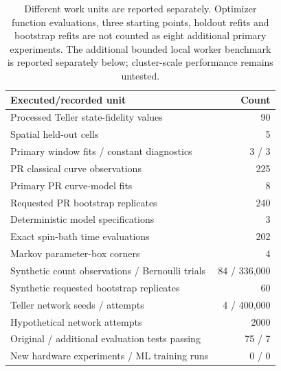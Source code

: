 \documentclass[10pt,a4paper]{article}
\begin{document}
\begin{table}[htbp]
\centering\small
\begin{tabular}{lr}
\toprule Executed/recorded unit & Count\\\midrule
Processed Teller state-fidelity values & 90\\
Spatial held-out cells & 5\\
Primary window fits / constant diagnostics & 3 / 3\\
PR classical curve observations & 225\\
Primary PR curve-model fits & 8\\
Requested PR bootstrap replicates & 240\\
Deterministic model specifications & 3\\
Exact spin-bath time evaluations & 202\\
Markov parameter-box corners & 4\\
Synthetic count observations / Bernoulli trials & 84 / 336,000\\
Synthetic requested bootstrap replicates & 60\\
Teller network seeds / attempts & 4 / 400,000\\
Hypothetical network attempts & 2000\\
Original / additional evaluation tests passing & 75 / 7\\
New hardware experiments / ML training runs & 0 / 0\\\bottomrule
\end{tabular}
\caption{Different work units are reported separately. Optimizer function evaluations, three starting points, holdout refits and bootstrap refits are not counted as eight additional primary experiments. The additional bounded local worker benchmark is reported separately below; cluster-scale performance remains untested.}
\end{table}


\clearpage
\end{document}
